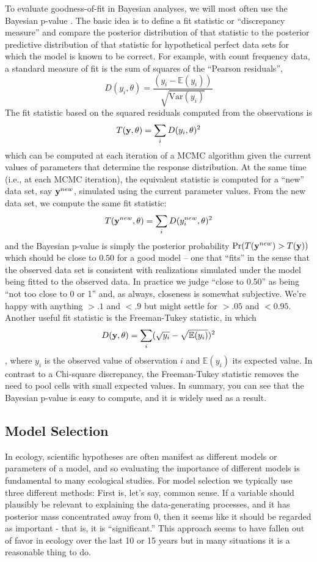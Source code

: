 {{{To evaluate goodness-of-fit in Bayesian analyses, we will most often
use the Bayesian p-value \citep{gelman_etal:1996}.  The basic idea is to define
a fit statistic or ``discrepancy measure'' and compare the posterior distribution of that
statistic to the posterior predictive distribution of that statistic
for hypothetical perfect data sets for which the model is known to be correct. For
example, with count frequency data, a standard measure of fit is the
sum of squares of the ``Pearson residuals'',
\[
D(y_i,\theta) = \frac{(y_i - \mathbb{E}(y_i))}{\sqrt{\mbox{Var}( y_{i} )}}
\]
The fit statistic based on the squared residuals computed from the
observations is 
\[
T({\bf y}, \theta) = \sum_{i} D(y_{i},\theta)^{2}
\]
which can be computed at each iteration of a MCMC algorithm given the
current values of parameters that determine the
 response distribution.  At the same time (i.e., at each MCMC
 iteration),
the equivalent statistic is computed for a
``new'' data set, say ${\bf y}^{new}$, 
simulated using the current parameter values. From the new data set,
we compute the same fit statistic:
\[
T({\bf y}^{new}, \theta) = \sum_{i} D(y_{i}^{new},\theta)^{2}
\]
and 
the
Bayesian p-value is simply the posterior probability $\Pr(T({\bf
  y}^{new})  >  T({\bf y}))$
 which should be close to $0.50$ for a good model -- one that
 ``fits'' in the sense that the observed data set is
 consistent with realizations simulated under the model being fitted
 to the observed data. In practice
we judge ``close to 0.50'' as being ``not too close to 0 or 1'' and,
as always, closeness is somewhat subjective. We're happy with anything
$>.1$ and $<.9$ but might settle for $>.05$ and $<0.95$. 
Another useful fit statistic is the Freeman-Tukey
statistic, in which
\[
D({\bf y},\theta) = \sum_{i} ( \sqrt{y_{i}} - \sqrt{\mathbb{E}(y_{i})} )^2
\]
\citep{brooks_etal:2000}, where $y_{i}$ is the observed value of
observation $i$ and $\mathbb{E}(y_{i})$ its expected value. In contrast to a
Chi-square discrepancy, the Freeman-Tukey statistic removes the need
to pool cells with small expected values.
In summary, you can see that 
the Bayesian p-value is easy to compute,
and it is widely used as a result.


\subsection{Model Selection }

In ecology, scientific hypotheses are often manifest as different models or parameters
 of a model, and so
evaluating the importance of different models is fundamental 
to many ecological studies.
For model selection we typically use three different methods: First
is, let's say, common sense. If a variable should plausibly be
relevant to explaining the data-generating processes, and it has 
 posterior mass
concentrated away from 0, then it seems like it should be regarded as
important - that is, it is ``significant.''  This approach seems to
have fallen out of favor in ecology over the last 10 or
15 years but in many situations it is a reasonable thing to do.

}}}
